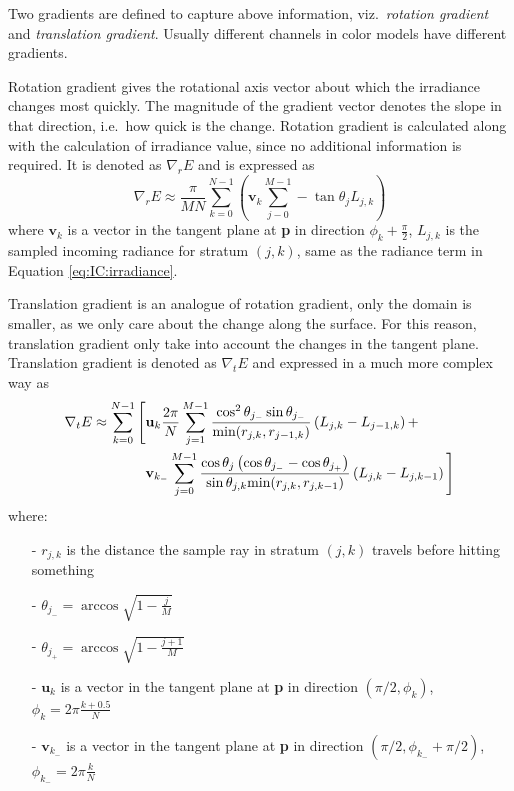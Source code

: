\documentclass[]{book}
\begin{document}
Two gradients are defined to capture above information, viz.\ \textit{rotation gradient} and \textit{translation gradient}.
Usually different channels in color models have different gradients.

Rotation gradient gives the rotational axis vector about which the irradiance changes most quickly.
The magnitude of the gradient vector denotes the slope in that direction, i.e.\ how quick is the change.
Rotation gradient is calculated along with the calculation of irradiance value, since no additional information is required.
It is denoted as $\nabla_{r}E$ and is expressed as
\begin{equation}
\label{eq:IC:rotation}
	\nabla_r E \approx \frac{\pi}{MN} \sum_{k=0}^{N-1}\left({\textbf{v}}_k \sum_{j-0}^{M-1} - \tan \theta_j L_{j,k}\right)
\end{equation}
where ${\textbf{v}}_k$ is a vector in the tangent plane at \textbf{p} in direction $\phi_k + \frac{\pi}{2}$, $L_{j,k}$ is the sampled incoming radiance for stratum $(j,k )$, same as the radiance term in Equation \ref{eq:IC:irradiance}.

Translation gradient is an analogue of rotation gradient, only the domain is smaller, as we only care about the change along the surface.
For this reason, translation gradient only take into account the changes in the tangent plane. 
Translation gradient is denoted as $\nabla_{t}E$ and expressed in a much more complex way as
\begin{equation}
\begin{split}
	\nabla_{t}E \approx \sum_{k=0}^{N-1} \Bigg[ &\textbf{u}_k \frac{2\pi}{N} \sum_{j=1}^{M-1} \frac{\cos^2\theta_{j_-}\sin\theta_{j_-}}{\textup{min}(r_{j,k}, r_{j-1,k})} \left( L_{j,k}-L_{j-1,k} \right ) + \\
	&\textbf{v}_{k_-} \sum_{j=0}^{M-1} \frac{\cos\theta_j \left( \cos\theta_{j_-} - \cos\theta_{j_+} \right )}{\sin\theta_{j,k} \textup{min}(r_{j,k}, r_{j,k-1})} \left( L_{j,k}-L_{j,k-1} \right ) \Bigg]
\end{split}
\end{equation}
where:
\begin{itemize}
	\item[-] $r_{j,k}$ is the distance the sample ray in stratum $(j,k)$ travels before hitting something
	\item[-] $\theta_{j_-} = \arccos\sqrt{1-\frac{j}{M}}$
	\item[-] $\theta_{j_+} = \arccos\sqrt{1-\frac{j+1}{M}}$
	\item[-] $\textbf{u}_k$ is a vector in the tangent plane at \textbf{p} in direction  $(\pi/2, \phi_k)$, $\phi_k = 2\pi\frac{k+0.5}{N}$
	\item[-] ${\textbf{v}}_{k_-}$ is a vector in the tangent plane at \textbf{p} in direction $(\pi/2, \phi_{k_-} + \pi/2)$, $\phi_{k_-} = 2\pi\frac{k}{N}$
\end{itemize}
\end{document}
